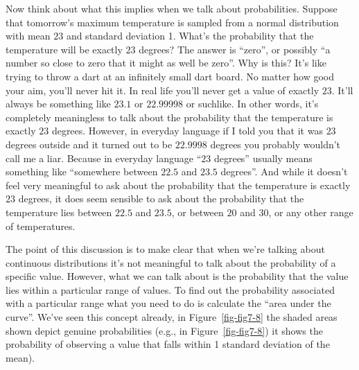 \documentclass[
  letterpaper,
]{book}
\begin{document}
Now think about what this implies when we talk about probabilities.
Suppose that tomorrow's maximum temperature is sampled from a normal
distribution with mean \(23\) and standard deviation 1. What's the
probability that the temperature will be exactly \(23\) degrees? The
answer is ``zero'', or possibly ``a number so close to zero that it
might as well be zero''. Why is this? It's like trying to throw a dart
at an infinitely small dart board. No matter how good your aim, you'll
never hit it. In real life you'll never get a value of exactly \(23\).
It'll always be something like \(23.1\) or \(22.99998\) or suchlike. In
other words, it's completely meaningless to talk about the probability
that the temperature is exactly \(23\) degrees. However, in everyday
language if I told you that it was \(23\) degrees outside and it turned
out to be \(22.9998\) degrees you probably wouldn't call me a liar.
Because in everyday language ``\(23\) degrees'' usually means something
like ``somewhere between \(22.5\) and \(23.5\) degrees''. And while it
doesn't feel very meaningful to ask about the probability that the
temperature is exactly \(23\) degrees, it does seem sensible to ask
about the probability that the temperature lies between \(22.5\) and
\(23.5\), or between \(20\) and \(30\), or any other range of
temperatures.

The point of this discussion is to make clear that when we're talking
about continuous distributions it's not meaningful to talk about the
probability of a specific value. However, what we can talk about is the
probability that the value lies within a particular range of values. To
find out the probability associated with a particular range what you
need to do is calculate the ``area under the curve''. We've seen this
concept already, in Figure~\ref{fig-fig7-8} the shaded areas shown
depict genuine probabilities (e.g., in Figure~\ref{fig-fig7-8}) it shows
the probability of observing a value that falls within 1 standard
deviation of the mean).
\end{document}
